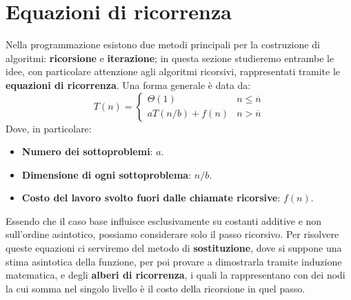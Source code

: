 \section{Equazioni di ricorrenza}
Nella programmazione esistono due metodi principali per la costruzione di algoritmi: \textbf{ricorsione} e \textbf{iterazione}; in questa sezione studieremo entrambe le idee, con particolare attenzione agli algoritmi ricorsivi, rappresentati tramite le \textbf{equazioni di ricorrenza}. Una forma generale è data da: \[T(n) = \begin{cases}
	\Theta(1) & n \leq \overline{n}\\
	aT(n/b) + f(n) & n > \overline{n}
\end{cases}\]
\noindent Dove, in particolare: \begin{itemize}
	\item \textbf{Numero dei sottoproblemi}: $a$.
	\item \textbf{Dimensione di ogni sottoproblema}: $n/b$.
	\item \textbf{Costo del lavoro svolto fuori dalle chiamate ricorsive}: $f(n)$.
\end{itemize}
\noindent Essendo che il caso base influisce esclusivamente su costanti additive e non sull'ordine asintotico, possiamo considerare solo il passo ricorsivo. Per risolvere queste equazioni ci serviremo del metodo di \textbf{sostituzione}, dove si suppone una stima asintotica della funzione, per poi provare a dimostrarla tramite induzione matematica, e degli \textbf{alberi di ricorrenza}, i quali la rappresentano con dei nodi la cui somma nel singolo livello è il costo della ricorsione in quel passo.
